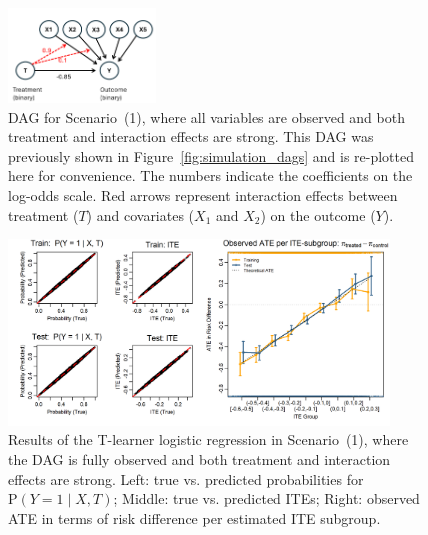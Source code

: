 \begin{figure}[htbp]
\centering
\includegraphics[width=0.35\textwidth]{img/results_ITE_simulation/simulation_observed.png}
\caption{DAG for Scenario~(1), where all variables are observed and both treatment and interaction effects are strong. This DAG was previously shown in Figure~\ref{fig:simulation_dags} and is re-plotted here for convenience. The numbers indicate the coefficients on the log-odds scale. Red arrows represent interaction effects between treatment ($T$) and covariates ($X_1$ and $X_2$) on the outcome ($Y$).}
\label{fig:fully_observed_dag}
\end{figure}


\begin{figure}[htbp]
\centering
\includegraphics[width=0.9\textwidth]{img/results_ITE_simulation/fully_observed_glm_tlearner.png}
\caption{Results of the T-learner logistic regression in Scenario~(1), where the DAG is fully observed and both treatment and interaction effects are strong. Left: true vs. predicted probabilities for $\text{P}(Y = 1 \mid X, T)$; Middle: true vs. predicted ITEs; Right: observed ATE in terms of risk difference per estimated ITE subgroup.}
\label{fig:fully_observed_glm_tlearner}
\end{figure}


